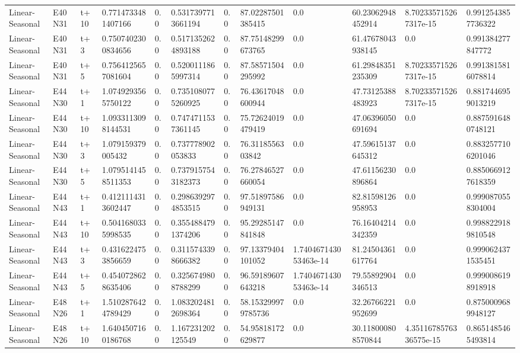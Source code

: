 \begin{landscape}
\begin{longtable}{llllllllllll}
Linear-Seasonal & E40N31 & t+10 & 0.7714733481407166 & 0.0 & 0.5317397713661194 & 0.0 & 87.02287501385415 & 0.0 & 60.23062948452914 & 8.702335715267317e-15 & 0.9912543857736322 \\
Linear-Seasonal & E40N31 & t+3 & 0.7507402300834656 & 0.0 & 0.5171352624893188 & 0.0 & 87.75148299673765 & 0.0 & 61.47678043938145 & 0.0 & 0.991384277847772 \\
Linear-Seasonal & E40N31 & t+5 & 0.7564125657081604 & 0.0 & 0.5200111865997314 & 0.0 & 87.58571504295992 & 0.0 & 61.29848351235309 & 8.702335715267317e-15 & 0.9913815816078814 \\
Linear-Seasonal & E44N30 & t+1 & 1.0749293565750122 & 0.0 & 0.7351080775260925 & 0.0 & 76.43617048600944 & 0.0 & 47.73125388483923 & 8.702335715267317e-15 & 0.8817446959013219 \\
Linear-Seasonal & E44N30 & t+10 & 1.0933113098144531 & 0.0 & 0.7474711537361145 & 0.0 & 75.72624019479419 & 0.0 & 47.06396050691694 & 0.0 & 0.8875916480748121 \\
Linear-Seasonal & E44N30 & t+3 & 1.079159379005432 & 0.0 & 0.737778902053833 & 0.0 & 76.3118556303842 & 0.0 & 47.59615137645312 & 0.0 & 0.8832577106201046 \\
Linear-Seasonal & E44N30 & t+5 & 1.0795141458511353 & 0.0 & 0.7379157543182373 & 0.0 & 76.27846527660054 & 0.0 & 47.61156230896864 & 0.0 & 0.8850669127618359 \\
Linear-Seasonal & E44N43 & t+1 & 0.4121114313602447 & 0.0 & 0.2986392974853515 & 0.0 & 97.51897586949131 & 0.0 & 82.81598126958953 & 0.0 & 0.9990870558304004 \\
Linear-Seasonal & E44N43 & t+10 & 0.5041680335998535 & 0.0 & 0.3554884791374206 & 0.0 & 95.29285147841848 & 0.0 & 76.16404214342359 & 0.0 & 0.9988229189810548 \\
Linear-Seasonal & E44N43 & t+3 & 0.4316224753856659 & 0.0 & 0.3115743398666382 & 0.0 & 97.13379404101052 & 1.740467143053463e-14 & 81.24504361617764 & 0.0 & 0.9990624371535451 \\
Linear-Seasonal & E44N43 & t+5 & 0.4540728628635406 & 0.0 & 0.3256749808788299 & 0.0 & 96.59189607643218 & 1.740467143053463e-14 & 79.55892904346513 & 0.0 & 0.9990086198918918 \\
Linear-Seasonal & E48N26 & t+1 & 1.5102876424789429 & 0.0 & 1.0832024812698364 & 0.0 & 58.153299979785736 & 0.0 & 32.26766221952699 & 0.0 & 0.8750009689948127 \\
Linear-Seasonal & E48N26 & t+10 & 1.6404507160186768 & 0.0 & 1.167231202125549 & 0.0 & 54.95818172629877 & 0.0 & 30.118000808570844 & 4.3511678576336575e-15 & 0.8651485465493814 \\

\end{longtable}
\end{landscape}
